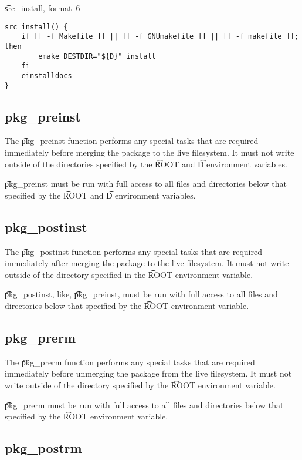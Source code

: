 \begin{listing}[H]
\caption{\t{src_install}, format~6} \label{lst:src-install-6}
\begin{verbatim}
src_install() {
    if [[ -f Makefile ]] || [[ -f GNUmakefile ]] || [[ -f makefile ]]; then
        emake DESTDIR="${D}" install
    fi
    einstalldocs
}
\end{verbatim}
\end{listing}

\subsection{pkg_preinst}

The \t{pkg_preinst} function performs any special tasks that are required immediately before
merging the package to the live filesystem. It must not write outside of the directories specified
by the \t{ROOT} and \t{D} environment variables.

\t{pkg_preinst} must be run with full access to all files and directories below that specified by
the \t{ROOT} and \t{D} environment variables.

\subsection{pkg_postinst}

The \t{pkg_postinst} function performs any special tasks that are required immediately after
merging the package to the live filesystem. It must not write outside of the directory specified
in the \t{ROOT} environment variable.

\t{pkg_postinst}, like, \t{pkg_preinst}, must be run with full access to all files and directories
below that specified by the \t{ROOT} environment variable.

\subsection{pkg_prerm}

The \t{pkg_prerm} function performs any special tasks that are required immediately before
unmerging the package from the live filesystem. It must not write outside of the directory specified
by the \t{ROOT} environment variable.

\t{pkg_prerm} must be run with full access to all files and directories below that specified by
the \t{ROOT} environment variable.

\subsection{pkg_postrm}

